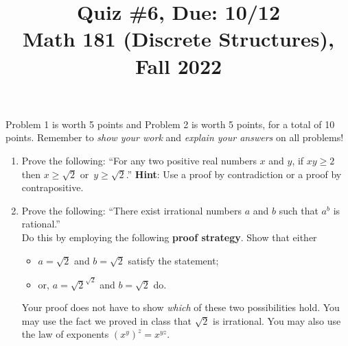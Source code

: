 \documentclass[11pt]{article}
\title{Quiz \#6, Due: 10/12 \\Math 181 (Discrete Structures), Fall 2022}
\date{}
\begin{document}
\maketitle

\thispagestyle{empty}

\vspace{-1cm}

Problem 1 is worth 5 points and Problem 2 is worth 5 points, for a total of 10 points. Remember to \emph{show your work} and \emph{explain your answers} on all problems!

\begin{enumerate}
\item Prove the following: ``For any two positive real numbers $x$ and $y$, if $xy \geq 2$ then $x \geq \sqrt{2}$ or~$y \geq \sqrt{2}$.'' {\bf Hint}: Use a proof by contradiction or a proof by contrapositive.

\item Prove the following: ``There exist irrational numbers $a$ and $b$ such that $a^b$ is rational.'' \\ Do this by employing the following {\bf proof strategy}. Show that either
\begin{itemize} 
\item $a=\sqrt{2}$ and $b=\sqrt{2}$ satisfy the statement;
\item or, $a=\sqrt{2}^{\sqrt{2}}$ and $b=\sqrt{2}$ do.
\end{itemize}
Your proof does not have to show \emph{which} of these two possibilities hold. You may use the fact we proved in class that $\sqrt{2}$ is irrational. You may also use the law of exponents $(x^y)^{z}= x^{yz}$.
\end{enumerate}
\end{document}

